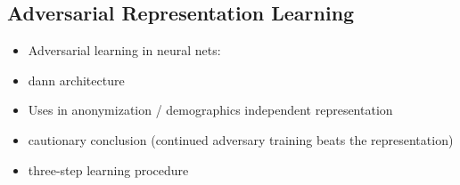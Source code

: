 \subsection{Adversarial Representation Learning}
\begin{itemize}
    \item Adversarial learning in neural nets: \citet{goodfellow2014generative}
    \item \Ac{dann} architecture \citep{ganin2016domain}
    \item Uses in anonymization / demographics independent representation \citet{elazar2018adversarial,li2018towards}
    \item \citet{elazar2018adversarial} cautionary conclusion (continued adversary training beats the representation)
    \item \citet{feutry2018learning} three-step learning procedure
\end{itemize}
